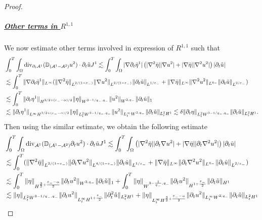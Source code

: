 \documentclass[letterpaper,reqno,10pt,twoside]{amsart}
\theoremstyle{definition}
\theoremstyle{remark}
\def\p{\partial}
\def\Om{\Omega}
\def\dive{\mathop{\rm div}\nolimits}
\begin{document}
\begin{proof}
			\subparagraph{\underline{Other terms in $R^{1,1}$}}
			We now estimate other terms involved in expression of $R^{1,1}$ such that
			\begin{equation}\label{est:remain_bulk21}
				\begin{aligned}
					&\int_0^T\int_\Om \dive_{\p_t\mathcal{A}^1}(\mathbb{D}_{(\mathcal{A}^1-\mathcal{A}^2)}{u}^2)\cdot\p_t\tilde{u}J^1\lesssim\int_0^T\int_\Om |\nabla\p_t\bar{\eta}^1|\left(|\nabla^2\bar{\eta}||\nabla{u}^2|+|\nabla\bar{\eta}||\nabla^2{u}^2|\right)|\p_t\tilde{u}|\\
					&\lesssim\int_0^T\|\nabla\p_t\bar{\eta}^1\|_{L^\infty}(\|\nabla^2\bar{\eta}\|_{L^{2/(1-\varepsilon_-)}}\|\nabla{u}^2\|_{L^{2/(1-\varepsilon_-)}}\|\p_t\tilde{u}\|_{L^{1/\varepsilon_-}}+\|\nabla\bar{\eta}\|_{L^\infty}\|\nabla^2{u}^2\|_{L^{q_-}}\|\p_t\tilde{u}\|_{L^{2/\varepsilon_-}})\\
					&\lesssim\int_0^T\|\p_t\eta^1\|_{H^{3/2+(\varepsilon_--\alpha)/2}}\|\eta\|_{W^{3-1/q_-,q_-}}\|{u}^2\|_{W^{2,q_-}}\|\p_t\tilde{u}\|_{1}\\
					&\lesssim  \|\p_t\eta^1\|_{L^{\infty}H^{3/2+(\varepsilon_--\alpha)/2}}\|\eta\|_{L_{t}^{2}W^{3-1/q_-,q_-}}\|{u}^2\|_{L_{t}^{\infty}W^{2,q_-}}\|\p_t\tilde{u}\|_{L_{t}^{2}H^{1}}\lesssim\delta\|\p_{t}\eta\|_{L_{t}^2W^{3-1/q_-,q_-}}\|\p_t\tilde{u}\|_{L_{t}^2H^1}.
				\end{aligned}
			\end{equation}
			Then using the similar estimate, we obtain the following estimate
			\begin{equation}
				\begin{aligned}
					&\int_0^T\int_\Om \dive_{\mathcal{A}^1}(\mathbb{D}_{(\mathcal{A}^1-\mathcal{A}^2)}\p_{t}{u}^2)\cdot\p_t\tilde{u}J^1\lesssim\int_0^T\int_\Om \left(|\nabla^2\bar{\eta}||\p_{t}\nabla{u}^2|+|\nabla\bar{\eta}||\p_{t}\nabla^2{u}^2|\right)|\p_t\tilde{u}|\\
					&\lesssim\int_0^T(\|\nabla^2\bar{\eta}\|_{L^{2/(1-\varepsilon_-)}}\|\p_{t}\nabla{u}^2\|_{L^{4/(1-\varepsilon_-)}}\|\p_t\tilde{u}\|_{L^{1/\varepsilon_-}}+\|\nabla\bar{\eta}\|_{L^\infty}\|\p_{t}\nabla^2{u}^2\|_{L^{q_-}}\|\p_t\tilde{u}\|_{L^{2/\varepsilon_-}})\\
					&\lesssim\int_0^T\|\eta\|_{H^{\frac{3}{2}+\frac{\varepsilon_{-}-\alpha}{2}}}\|\p_{t}{u}^2\|_{W^{2,q_-}}\|\p_t\tilde{u}\|_{1}+\int_{0}^{T}\|\eta\|_{W^{3-\frac{1}{q_{-}},q_{-}}}\|\p_{t}u^{2}\|_{H^{1+\frac{\varepsilon_{-}}{2}}}\|\p_{t}\tilde{u}\|_{H^{1}}\\
					&\lesssim  \|\eta\|_{L_{t}^{2}W^{3-1/q_-,q_-}}\|\p_{t}{u}^2\|_{L_{t}^{\infty}H^{1+\frac{\varepsilon_{-}}{2}}}\|\p_t^{2}\tilde{u}\|_{L_{t}^{2}H^{1}}+ \|\eta\|_{L_{t}^{\infty}H^{\frac{3}{2}+\frac{\varepsilon_{-}-\alpha}{2}}}\|\p_{t}{u}^2\|_{L_{t}^{\infty}W^{2,q_{-}}}\|\p_{t}\tilde{u}\|_{L_{t}^{2}H^{1}}\\

\end{aligned}
\end{equation}
\end{proof}
\end{document}
